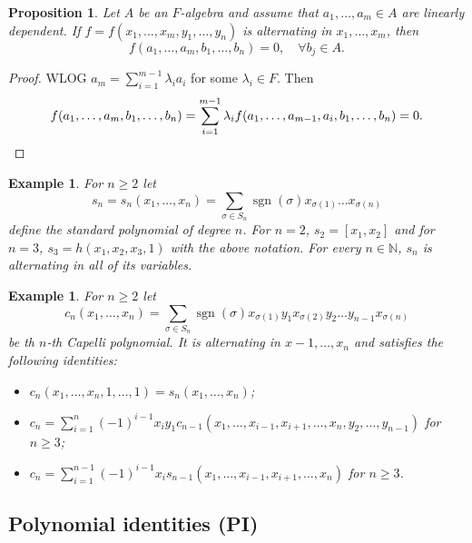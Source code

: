 \documentclass[10pt, a4paper]{article}
\newtheorem{proposition}[thm]{Proposition}
\newtheorem{example}[thm]{Example}
\newenvironment{noticeC}{%
  \tcolorbox[%
  notitle,
  empty,
  enhanced,  %
  breakable,
  coltext=black, 
  fontupper=\rmfamily,
  noparskip,
  sharp corners,
  boxrule=-1pt,  %
  frame hidden,
  left=7pt,  %
  right=7pt,
  top=5pt,
  bottom=5pt,
  before skip=2.5ex plus 2pt,
  after skip=2.5ex plus 2pt,
  overlay unbroken and last={%
  },
  ]}
{\endtcolorbox}
\newenvironment{myproof}%
  {\begin{noticeC}\begin{proof}}%
  {\end{proof}\end{noticeC}}
\newcommand{\N}{\mathbb {N}}
\DeclareMathOperator{\sgn}{sgn}
\begin{document}
\begin{proposition}
  Let $A$ be an $F$-algebra and assume that $a_1, \dots, a_m \in A$ are linearly dependent.
  If $f = f(x_1, \dots, x_m, y_1, \dots, y_n)$ is alternating in $x_1, \dots, x_m$, then 
  $$f(a_1, \dots, a_m, b_1, \dots, b_n) = 0,\quad \forall b_j \in A.$$
\end{proposition}

\begin{myproof}
  WLOG $a_m = \sum_{i = 1} ^{m - 1} \lambda_i a_i$ for some $\lambda_i \in F$.
  Then 
  \begin{equation*}
    f(a_1, \dots, a_m, b_1, \dots, b_n) = \sum_{i = 1} ^{m - 1} \lambda_i f(a_1, \dots, a_{m - 1}, a_i, b_1, \dots, b_n) = 0. \qedhere
  \end{equation*}
\end{myproof}

\begin{example}
  For $n \geq 2$ let $$s_n = s_n (x_1, \dots, x_n) = \sum_{\sigma \in S_n} \sgn (\sigma) x_{\sigma(1)} \dots x_{\sigma(n)}$$
  define the standard polynomial of degree $n$. For $n = 2$, $s_2 = [x_1, x_2]$
  and for $n = 3$, $s_3 = h(x_1, x_2, x_3, 1)$ with the above notation. For every $n \in \N$,
  $s_n$ is alternating in all of its variables.
\end{example}

\begin{example}
  For $n \geq 2$ let 
  $$c_n (x_1, \dots, x_n) = \sum_{\sigma \in S_n} \sgn (\sigma) x_{\sigma(1)} y_1 x_{\sigma(2)} y_2 \dots y_{n - 1} x_{\sigma(n)}$$
  be th $n$-th Capelli polynomial. It is alternating in $x-1, \dots, x_n$ and satisfies the following identities:
  \begin{itemize}
    \item $c_n (x_1, \dots, x_n, 1, \dots, 1) = s_n (x_1, \dots, x_n)$;
    \item $c_n = \sum_{i = 1} ^n (-1)^{i - 1}  x_i y_1 c_{n - 1} (x_1, \dots, x_{i - 1}, x_{i + 1}, \dots, x_n, y_2, \dots, y_{n - 1})$ for $n \geq 3$;
    \item $c_n = \sum_{i = 1} ^{n - 1} (-1)^{i - 1}  x_i s_{n - 1} (x_1, \dots, x_{i - 1}, x_{i + 1}, \dots, x_n)$ for $n \geq 3$.
  \end{itemize}
\end{example}

\subsection{Polynomial identities (PI)}
\end{document}
